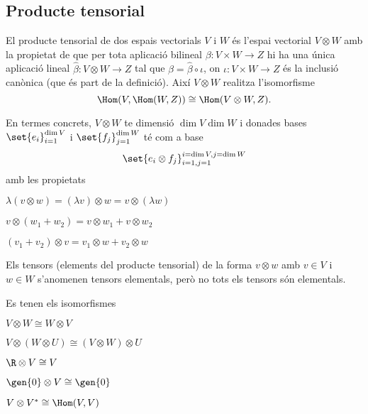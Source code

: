 \documentclass[12pt,twocolumn]{article}
\begin{document}
\subsection{Producte tensorial}
\begin{definition}
	El producte tensorial de dos espais vectorials \( V \) i \( W \) és l'espai vectorial \(
	V \otimes W \) amb la propietat de que per tota aplicació bilineal \( \beta \colon V
	\times W \to Z \) hi ha una única aplicació lineal \( \hat{\beta} \colon V \otimes W \to
	Z \) tal que \( \beta = \hat{\beta} \circ \iota \), on \( \iota \colon V \times W \to Z
	\) és la inclusió canònica (que és part de la definició). Així \( V \otimes W \)
	realitza l'isomorfisme
	\begin{equation*}
		\Hom(V, \Hom(W, Z)) \cong \Hom(V \otimes W, Z).
	\end{equation*}
	

	En termes concrets, \( V \otimes W \) te dimensió \( \dim V \dim W \) i donades bases
	\( \set{e_i}_{i=1}^{\dim V} \) i \( \set{f_j}_{j=1}^{\dim W} \) té com a base
	\begin{equation*}
		\set{e_i \otimes f_j}_{i = 1, j = 1}^{i = \dim V, j = \dim W}
	\end{equation*}
	amb les propietats
	\begin{points}
	\item \( \lambda(v \otimes w) = (\lambda v) \otimes w = v \otimes (\lambda w) \)
	\item \( v \otimes (w_1 + w_2) = v \otimes w_1 + v \otimes w_2 \)
	\item \( (v_1 + v_2) \otimes v = v_1 \otimes w +  v_2 \otimes w \)
	\end{points}
\end{definition}
\begin{observation}
	Els tensors (elements del producte tensorial) de la forma \( v \otimes w \) amb \( v \in
	V	\) i \( w \in W \) s'anomenen tensors elementals, però no tots els tensors són
	elementals.
\end{observation}
\begin{observation}
	Es tenen els isomorfismes
	\begin{points}
	\item \( V \otimes W \cong W \otimes V \)
	\item \( V \otimes (W \otimes U) \cong (V \otimes W) \otimes U \)
	\item \( \R \otimes V \cong V \)
	\item \( \gen{0} \otimes V \cong \gen{0} \)
	\item \( V \otimes V^\ast \cong \Hom(V,V) \)
	\end{points}
\end{observation}
\end{document}
